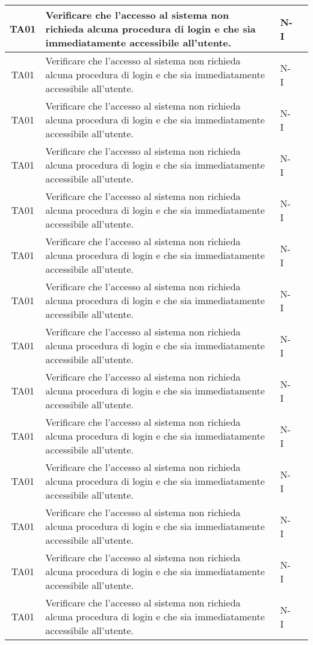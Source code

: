 \begin{longtable}{|c|p{5cm}|p{2cm}|c|}
    \hline
    TA01 & Verificare che l'accesso al sistema non richieda alcuna procedura di login e che sia immediatamente accessibile all'utente. & N-I \\
    \hline
    TA01 & Verificare che l'accesso al sistema non richieda alcuna procedura di login e che sia immediatamente accessibile all'utente. & N-I \\
    \hline
    TA01 & Verificare che l'accesso al sistema non richieda alcuna procedura di login e che sia immediatamente accessibile all'utente. & N-I \\
    \hline
    TA01 & Verificare che l'accesso al sistema non richieda alcuna procedura di login e che sia immediatamente accessibile all'utente. & N-I \\
    \hline
    TA01 & Verificare che l'accesso al sistema non richieda alcuna procedura di login e che sia immediatamente accessibile all'utente. & N-I \\
    \hline
    TA01 & Verificare che l'accesso al sistema non richieda alcuna procedura di login e che sia immediatamente accessibile all'utente. & N-I \\
    \hline
    TA01 & Verificare che l'accesso al sistema non richieda alcuna procedura di login e che sia immediatamente accessibile all'utente. & N-I \\
    \hline
    TA01 & Verificare che l'accesso al sistema non richieda alcuna procedura di login e che sia immediatamente accessibile all'utente. & N-I \\
    \hline
    TA01 & Verificare che l'accesso al sistema non richieda alcuna procedura di login e che sia immediatamente accessibile all'utente. & N-I \\
    \hline
    TA01 & Verificare che l'accesso al sistema non richieda alcuna procedura di login e che sia immediatamente accessibile all'utente. & N-I \\
    \hline
    TA01 & Verificare che l'accesso al sistema non richieda alcuna procedura di login e che sia immediatamente accessibile all'utente. & N-I \\
    \hline
    TA01 & Verificare che l'accesso al sistema non richieda alcuna procedura di login e che sia immediatamente accessibile all'utente. & N-I \\
    \hline
    TA01 & Verificare che l'accesso al sistema non richieda alcuna procedura di login e che sia immediatamente accessibile all'utente. & N-I \\
    \hline
    TA01 & Verificare che l'accesso al sistema non richieda alcuna procedura di login e che sia immediatamente accessibile all'utente. & N-I \\

\end{longtable}
